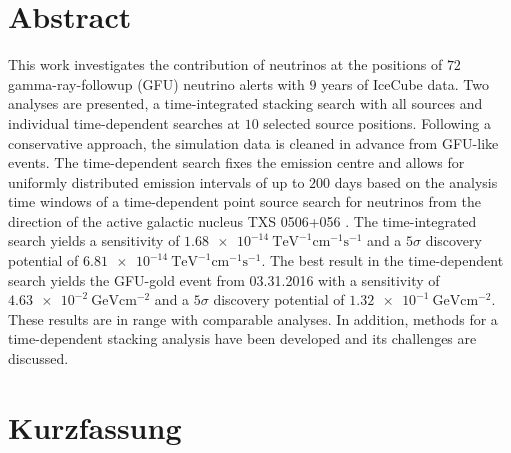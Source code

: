 \section*{Abstract}

This work investigates the contribution of neutrinos at the positions of $\num{72}$ gamma-ray-followup (GFU) neutrino alerts with $\num{9}$ years of IceCube data.
Two analyses are presented, a time-integrated stacking search with all sources and individual time-dependent searches at $\num{10}$ selected source positions.
Following a conservative approach, the simulation data is cleaned in advance from GFU-like events.
The time-dependent search fixes the emission centre and allows for uniformly distributed emission intervals of up to $\num{200}$ days based on the analysis time windows of a time-dependent point source search for neutrinos from the direction of the active galactic nucleus TXS 0506+056 \cite{_txs}.
The time-integrated search yields a sensitivity of $\SI{1.68e-14}{\tera\electronvolt\tothe{-1}\centi\meter\tothe{-1}\second\tothe{-1}}$ and a $\num{5}\sigma$ discovery potential of $\SI{6.81e-14}{\tera\electronvolt\tothe{-1}\centi\meter\tothe{-1}\second\tothe{-1}}$.
The best result in the time-dependent search yields the GFU-gold event from 03.31.2016 with a sensitivity of $\SI{4.63e-2}{\giga\electronvolt\centi\meter\tothe{-2}}$ and a $\num{5}\sigma$ discovery potential of $\SI{1.32e-1}{\giga\electronvolt\centi\meter\tothe{-2}}$.
These results are in range with comparable analyses.
In addition, methods for a time-dependent stacking analysis have been developed and its challenges are discussed.

\section*{Kurzfassung}

